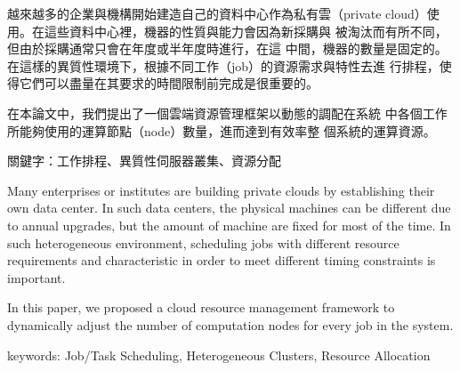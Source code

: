 %

\begin{abstractzh}
  越來越多的企業與機構開始建造自己的資料中心作為私有雲（private
  cloud）使用。在這些資料中心裡，機器的性質與能力會因為新採購與
  被淘汰而有所不同，但由於採購通常只會在年度或半年度時進行，在這
  中間，機器的數量是固定的。
  在這樣的異質性環境下，根據不同工作（job）的資源需求與特性去進
  行排程，使得它們可以盡量在其要求的時間限制前完成是很重要的。

  在本論文中，我們提出了一個雲端資源管理框架以動態的調配在系統
  中各個工作所能夠使用的運算節點（node）數量，進而達到有效率整
  個系統的運算資源。

  關鍵字：工作排程、異質性伺服器叢集、資源分配
\end{abstractzh}

\begin{abstracten}
  Many enterprises or institutes are building private clouds by
  establishing their own data center.
  In such data centers, the physical machines can be different due to
  annual upgrades,  but the amount of machine are fixed for most of the
  time.
  In such heterogeneous environment, scheduling jobs with different
  resource requirements and characteristic in order to meet different
  timing constraints is important.

  In this paper, we proposed a cloud resource management framework to
  dynamically adjust the number of computation nodes for every job in
  the system.

  keywords: Job/Task Scheduling, Heterogeneous Clusters, Resource Allocation
\end{abstracten}

